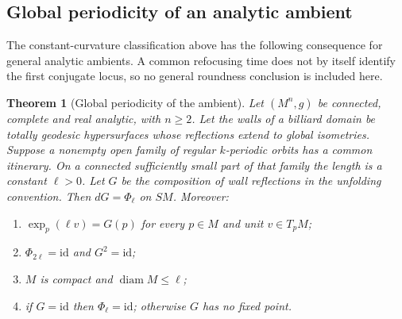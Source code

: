 \documentclass[11pt,a4paper]{article}
\theoremstyle{plain}
\newtheorem{theorem}{Theorem}[section]
\theoremstyle{definition}
\theoremstyle{remark}
\begin{document}
\subsection{Global periodicity of an analytic ambient}

The constant-curvature classification above has the following consequence
for general analytic ambients. A common refocusing time does not by itself
identify the first conjugate locus, so no general roundness conclusion is
included here.

\begin{theorem}[Global periodicity of the ambient]\label{thm:rigidambient}
Let $(M^n,g)$ be connected, complete and real analytic, with $n\ge2$.
Let the walls of a billiard domain be totally geodesic hypersurfaces whose
reflections extend to global isometries. Suppose a nonempty open family of
regular $k$-periodic orbits has a common itinerary. On a connected sufficiently
small part of that family the length is a constant $\ell>0$. Let $G$ be the
composition of wall reflections in the unfolding convention. Then
$dG=\Phi_\ell$ on $SM$. Moreover:
\begin{enumerate}[label=\textup{(\roman*)},nosep]
\item $\exp_p(\ell v)=G(p)$ for every $p\in M$ and unit $v\in T_pM$;
\item $\Phi_{2\ell}=\mathrm{id}$ and $G^2=\mathrm{id}$;
\item $M$ is compact and $\operatorname{diam}M\le\ell$;
\item if $G=\mathrm{id}$ then $\Phi_\ell=\mathrm{id}$; otherwise $G$ has no
fixed point.
\end{enumerate}
\end{theorem}
\end{document}
